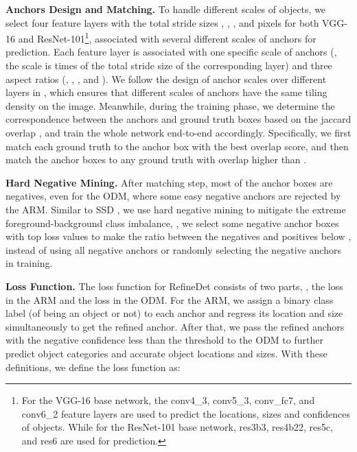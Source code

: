 \documentclass[10pt,twocolumn,letterpaper]{article}
\begin{document}
{\noindent \textbf{Anchors Design and Matching.}}
To handle different scales of objects, we select four feature layers with the total stride sizes , , , and  pixels for both VGG-16 and ResNet-101\footnote{For the VGG-16 base network, the conv4\_3, conv5\_3, conv\_fc7, and conv6\_2 feature layers are used to predict the locations, sizes and confidences of objects. While for the ResNet-101 base network, res3b3, res4b22, res5c, and res6 are used for prediction.}, associated with several different scales of anchors for prediction. Each feature layer is associated with one specific scale of anchors (\ie, the scale is  times of the total stride size of the corresponding layer) and three aspect ratios (\ie, , , and ). We follow the design of anchor scales over different layers in \cite{DBLP:conf/iccv/abs-1708-05237}, which ensures that different scales of anchors have the same tiling density \cite{DBLP:conf/ccbr/ZhangZLSWL17,DBLP:conf/ijcb/abs-1708-05234} on the image. Meanwhile, during the training phase, we determine the correspondence between the anchors and ground truth boxes based on the jaccard overlap \cite{DBLP:conf/cvpr/ErhanSTA14}, and train the whole network end-to-end accordingly. Specifically, we first match each ground truth to the anchor box with the best overlap score, and then match the anchor boxes to any ground truth with overlap higher than .

{\noindent \textbf{Hard Negative Mining.}}
After matching step, most of the anchor boxes are negatives, even for the ODM, where some easy negative anchors are rejected by the ARM. Similar to SSD \cite{DBLP:conf/eccv/LiuAESRFB16}, we use hard negative mining to mitigate the extreme foreground-background class imbalance, \ie, we select some negative anchor boxes with top loss values to make the ratio between the negatives and positives below , instead of using all negative anchors or randomly selecting the negative anchors in training.


{\noindent \textbf{Loss Function.}}
The loss function for RefineDet consists of two parts, \ie, the loss in the ARM and the loss in the ODM. For the ARM, we assign a binary class label (of being an object or not) to each anchor and regress its location and size simultaneously to get the refined anchor. After that, we pass the refined anchors with the negative confidence less than the threshold to the ODM to further predict object categories and accurate object locations and sizes. With these definitions, we define the loss function as:
\end{document}
